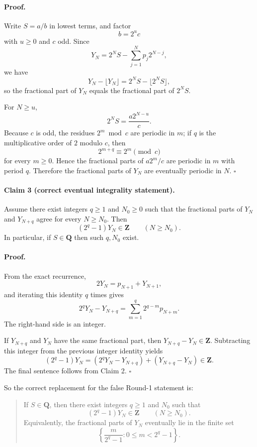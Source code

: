 \paragraph{Proof.}
Write $S=a/b$ in lowest terms, and factor
\[
b=2^u c
\]
with $u\ge 0$ and $c$ odd. Since
\[
Y_N=2^N S-\sum_{j=1}^{N} p_j 2^{N-j},
\]
we have
\[
Y_N-\lfloor Y_N\rfloor = 2^N S-\lfloor 2^N S\rfloor,
\]
so the fractional part of $Y_N$ equals the fractional part of $2^N S$.

For $N\ge u$,
\[
2^N S = \frac{a2^{N-u}}{c}.
\]
Because $c$ is odd, the residues $2^m \bmod c$ are periodic in $m$; if $q$ is the multiplicative order of $2$ modulo $c$, then
\[
2^{m+q}\equiv 2^m \pmod c
\]
for every $m\ge 0$. Hence the fractional parts of $a2^m/c$ are periodic in $m$ with period $q$. Therefore the fractional parts of $Y_N$ are eventually periodic in $N$.
\hfill$\square$

\medskip

\paragraph{Claim 3 (correct eventual integrality statement).}
Assume there exist integers $q\ge 1$ and $N_0\ge 0$ such that the fractional parts of $Y_N$ and $Y_{N+q}$ agree for every $N\ge N_0$. Then
\[
(2^q-1)Y_N\in \mathbf{Z}\qquad (N\ge N_0).
\]
In particular, if $S\in\mathbf{Q}$ then such $q,N_0$ exist.

\paragraph{Proof.}
From the exact recurrence,
\[
2Y_N=p_{N+1}+Y_{N+1},
\]
and iterating this identity $q$ times gives
\[
2^q Y_N-Y_{N+q} = \sum_{m=1}^{q} 2^{q-m} p_{N+m}.
\]
The right-hand side is an integer.

If $Y_{N+q}$ and $Y_N$ have the same fractional part, then $Y_{N+q}-Y_N\in\mathbf{Z}$. Subtracting this integer from the previous integer identity yields
\[
(2^q-1)Y_N = (2^qY_N-Y_{N+q}) + (Y_{N+q}-Y_N) \in \mathbf{Z}.
\]
The final sentence follows from Claim 2.
\hfill$\square$

So the correct replacement for the false Round-1 statement is:

\begin{quote}
If $S\in\mathbf{Q}$, then there exist integers $q\ge 1$ and $N_0$ such that
\[
(2^q-1)Y_N\in\mathbf{Z}\qquad (N\ge N_0).
\]
Equivalently, the fractional parts of $Y_N$ eventually lie in the finite set
\[
\left\{\frac{m}{2^q-1}:0\le m<2^q-1\right\}.
\]
\end{quote}

